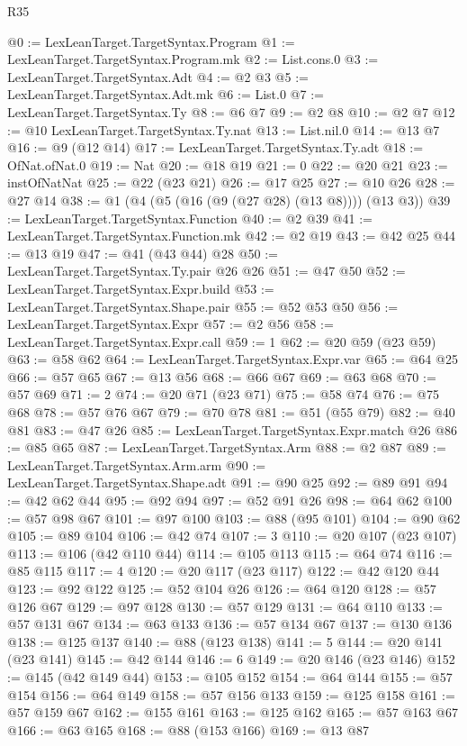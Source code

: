 \begin{lexlean}{R35}
\begin{coremodule}
{{{{{{{{{{{{{@0 := LexLeanTarget.TargetSyntax.Program
@1 := LexLeanTarget.TargetSyntax.Program.mk
@2 := List.cons.{0}
@3 := LexLeanTarget.TargetSyntax.Adt
@4 := @2 @3
@5 := LexLeanTarget.TargetSyntax.Adt.mk
@6 := List.{0}
@7 := LexLeanTarget.TargetSyntax.Ty
@8 := @6 @7
@9 := @2 @8
@10 := @2 @7
@12 := @10 LexLeanTarget.TargetSyntax.Ty.nat
@13 := List.nil.{0}
@14 := @13 @7
@16 := @9 (@12 @14)
@17 := LexLeanTarget.TargetSyntax.Ty.adt
@18 := OfNat.ofNat.{0}
@19 := Nat
@20 := @18 @19
@21 := 0
@22 := @20 @21
@23 := instOfNatNat
@25 := @22 (@23 @21)
@26 := @17 @25
@27 := @10 @26
@28 := @27 @14
@38 := @1 (@4 (@5 (@16 (@9 (@27 @28) (@13 @8)))) (@13 @3))
@39 := LexLeanTarget.TargetSyntax.Function
@40 := @2 @39
@41 := LexLeanTarget.TargetSyntax.Function.mk
@42 := @2 @19
@43 := @42 @25
@44 := @13 @19
@47 := @41 (@43 @44) @28
@50 := LexLeanTarget.TargetSyntax.Ty.pair @26 @26
@51 := @47 @50
@52 := LexLeanTarget.TargetSyntax.Expr.build
@53 := LexLeanTarget.TargetSyntax.Shape.pair
@55 := @52 @53 @50
@56 := LexLeanTarget.TargetSyntax.Expr
@57 := @2 @56
@58 := LexLeanTarget.TargetSyntax.Expr.call
@59 := 1
@62 := @20 @59 (@23 @59)
@63 := @58 @62
@64 := LexLeanTarget.TargetSyntax.Expr.var
@65 := @64 @25
@66 := @57 @65
@67 := @13 @56
@68 := @66 @67
@69 := @63 @68
@70 := @57 @69
@71 := 2
@74 := @20 @71 (@23 @71)
@75 := @58 @74
@76 := @75 @68
@78 := @57 @76 @67
@79 := @70 @78
@81 := @51 (@55 @79)
@82 := @40 @81
@83 := @47 @26
@85 := LexLeanTarget.TargetSyntax.Expr.match @26
@86 := @85 @65
@87 := LexLeanTarget.TargetSyntax.Arm
@88 := @2 @87
@89 := LexLeanTarget.TargetSyntax.Arm.arm
@90 := LexLeanTarget.TargetSyntax.Shape.adt
@91 := @90 @25
@92 := @89 @91
@94 := @42 @62 @44
@95 := @92 @94
@97 := @52 @91 @26
@98 := @64 @62
@100 := @57 @98 @67
@101 := @97 @100
@103 := @88 (@95 @101)
@104 := @90 @62
@105 := @89 @104
@106 := @42 @74
@107 := 3
@110 := @20 @107 (@23 @107)
@113 := @106 (@42 @110 @44)
@114 := @105 @113
@115 := @64 @74
@116 := @85 @115
@117 := 4
@120 := @20 @117 (@23 @117)
@122 := @42 @120 @44
@123 := @92 @122
@125 := @52 @104 @26
@126 := @64 @120
@128 := @57 @126 @67
@129 := @97 @128
@130 := @57 @129
@131 := @64 @110
@133 := @57 @131 @67
@134 := @63 @133
@136 := @57 @134 @67
@137 := @130 @136
@138 := @125 @137
@140 := @88 (@123 @138)
@141 := 5
@144 := @20 @141 (@23 @141)
@145 := @42 @144
@146 := 6
@149 := @20 @146 (@23 @146)
@152 := @145 (@42 @149 @44)
@153 := @105 @152
@154 := @64 @144
@155 := @57 @154
@156 := @64 @149
@158 := @57 @156 @133
@159 := @125 @158
@161 := @57 @159 @67
@162 := @155 @161
@163 := @125 @162
@165 := @57 @163 @67
@166 := @63 @165
@168 := @88 (@153 @166)
@169 := @13 @87
}}}}}}}}}}}}}
\end{coremodule}
\end{lexlean}
